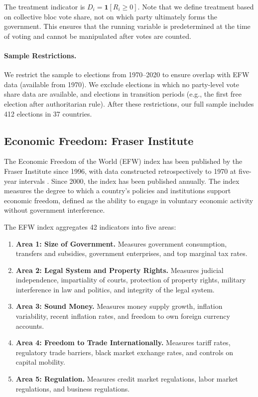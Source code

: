 \documentclass[12pt,a4paper]{article}
\begin{document}
The treatment indicator is $D_i = \mathbf{1}[R_i \geq 0]$. Note that 
we define treatment based on collective bloc vote share, not on which 
party ultimately forms the government. This ensures that the running 
variable is predetermined at the time of voting and cannot be manipulated 
after votes are counted.

\paragraph{Sample Restrictions.}
We restrict the sample to elections from 1970--2020 to ensure overlap 
with EFW data (available from 1970). We exclude elections in which no 
party-level vote share data are available, and elections in transition 
periods (e.g., the first free election after authoritarian rule). After 
these restrictions, our full sample includes 412 elections in 37 countries.

\subsection{Economic Freedom: Fraser Institute}

The Economic Freedom of the World (EFW) index has been published by the 
Fraser Institute since 1996, with data constructed retrospectively to 
1970 at five-year intervals \citep{gwartney2023economic}. Since 2000, 
the index has been published annually. The index measures the degree 
to which a country's policies and institutions support economic freedom, 
defined as the ability to engage in voluntary economic activity without 
government interference.

The EFW index aggregates 42 indicators into five areas:
\begin{enumerate}
    \item \textbf{Area 1: Size of Government.} Measures government 
    consumption, transfers and subsidies, government enterprises, and 
    top marginal tax rates.
    
    \item \textbf{Area 2: Legal System and Property Rights.} Measures 
    judicial independence, impartiality of courts, protection of property 
    rights, military interference in law and politics, and integrity of 
    the legal system.
    
    \item \textbf{Area 3: Sound Money.} Measures money supply growth, 
    inflation variability, recent inflation rates, and freedom to own 
    foreign currency accounts.
    
    \item \textbf{Area 4: Freedom to Trade Internationally.} Measures 
    tariff rates, regulatory trade barriers, black market exchange rates, 
    and controls on capital mobility.
    
    \item \textbf{Area 5: Regulation.} Measures credit market regulations, 
    labor market regulations, and business regulations.
\end{enumerate}
\end{document}
